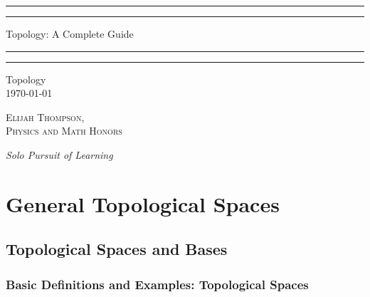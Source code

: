 \documentclass[12pt, a4paper, twoside, openright, titlepage]{book}
\begin{document}

\begin{titlepage}
    \centering
    \scshape
    \vspace*{\baselineskip}
    \rule{\textwidth}{1.6pt}\vspace*{-\baselineskip}\vspace*{2pt}
    \rule{\textwidth}{0.4pt}
    
    \vspace{0.75\baselineskip}
    
    {\LARGE Topology: A Complete Guide}
    
    \vspace{0.75\baselineskip}
    
    \rule{\textwidth}{0.4pt}\vspace*{-\baselineskip}\vspace{3.2pt}
    \rule{\textwidth}{1.6pt}
    
    \vspace{2\baselineskip}
    Topology \\
    \vspace*{3\baselineskip}
    \monthdayyeardate\today \\
    \vspace*{5.0\baselineskip}
    
    {\scshape\Large Elijah Thompson, \\ Physics and Math Honors\\}
    
    \vspace{1.0\baselineskip}
    \textit{Solo Pursuit of Learning}
\end{titlepage}

\tableofcontents

\part{General Topological Spaces}

\chapter{\textsection Topological Spaces and Bases}

\section{Basic Definitions and Examples: Topological Spaces}
\end{document}
